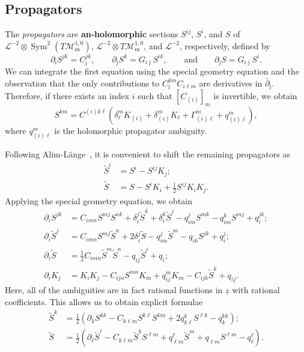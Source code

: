 \documentclass[10pt]{amsart}
\theoremstyle{definition}
\theoremstyle{remark}
\theoremstyle{plain}
\theoremstyle{definition}
\theoremstyle{remark}
\newcommand{\mc}[1]{\mathcal{#1}}
\newcommand{\uz}{\ul{z}}
\newcommand{\on}[1]{\operatorname{#1}}
\newcommand{\ms}[1]{\mathsf{#1}}
\newcommand{\ul}[1]{\underline{#1}}
\newcommand{\1}{\mathbf{1}}
\newcommand{\2}{\mathbf{2}}
\newcommand{\3}{\mathbf{3}}
\newcommand{\cs}{\ms{cs}}
\begin{document}
\subsection{Propagators}%
\label{sub:Propagators}

The \textit{propagators} are \textbf{an-holomorphic} sections $S^{ij}$, $S^i$, and $S$ of $\mc{L}^{-2}\otimes \on{Sym}^2(T\mc{M}_{\cs}^{1,0})$, $\mc{L}^{-2} \otimes T \mc{M}_{\cs}^{1,0}$, and $\mc{L}^{-2}$, respectively, defined by
\[ \partial_{\bar{\imath}} S^{jk} = C_{\bar{\imath}}^{jk}, \qquad \partial_{\bar{\jmath}} S^k = G_{i\bar{\jmath}} S^{ik}, \qquad \text{and} \qquad \partial_{\bar{\jmath}} S = G_{i\bar{\jmath}} S^i. \]
We can integrate the first equation using the special geometry equation and the observation that the only contributions to $C_{\bar{\jmath}}^{km} C_{i\ell m}$ are derivatives in $\bar{\partial}_{\bar{\jmath}}$. Therefore, if there exists an index $i$ such that $[C_{(i)}]_m$ is invertible, we obtain
\[ S^{km} = C^{(i)k\ell} (\delta_{\ell}^m K_{(i)} + \delta_{(i)}^m K_{\ell} + \Gamma^m_{(i)\ell} + q_{(i)\ell}^m), \]
where $q_{(i)\ell}^m$ is the holomorphic propagator ambiguity.

Following Alim-L\"ange~\cite{alimlange}, it is convenient to shift the remaining propagators as
\begin{align*}
    \tilde{S}^i &= S^i - S^{ij}K_j; \\
    \tilde{S} &= S - S^i K_i + \frac{1}{2} S^{ij} K_i K_j.
\end{align*}
Applying the special geometry equation, we obtain
\begin{align*}
    \partial_i S^{jk} &= C_{imn}S^{mj} S^{nk} + \delta_i^j\tilde{S}^k + \delta_i^k\tilde{S}^j - q_{im}^j S^{mk} - q_{im}^k S^{mj} + q_i^{jk}; \\
    \partial_i \tilde{S}^j &= C_{imn} S^{mj} \tilde{S}^n + 2 \delta_i^j\tilde{S} - q_{im}^j \tilde{S}^m - q_{ik}S^{jk} + q_i^j; \\
    \partial_i \tilde{S} &= \frac{1}{2} C_{imn}\tilde{S}^m \tilde{S}^n - q_{ij} \tilde{S}^j + q_i; \\
    \partial_i K_j &= K_i K_j - C_{ijn} S^{mn}K_m + q_{ij}^m K_m - C_{ijk} \tilde{S}^k + q_{ij}.
\end{align*}
Here, all of the ambiguities are in fact rational functions in $\uz$ with rational coefficients. This allows us to obtain explicit formulae
\begin{align*}
    \tilde{S}^k &= \frac{1}{2}(\partial_k S^{kk} - C_{k\ell m} S^{k\ell} S^{km} + 2 q_{k\ell}^k S^{\ell k} - q_k^{kk}); \\
    \tilde{S} &= \frac{1}{2} (\partial_{\ell}\tilde{S}^{\ell} - C_{k\ell m} \tilde{S}^k S^{\ell m} + q_{\ell m}^{\ell} \tilde{S}^m + q_{\ell m} S^{\ell m} - q_{\ell}^{\ell}). 
\end{align*}
\end{document}
